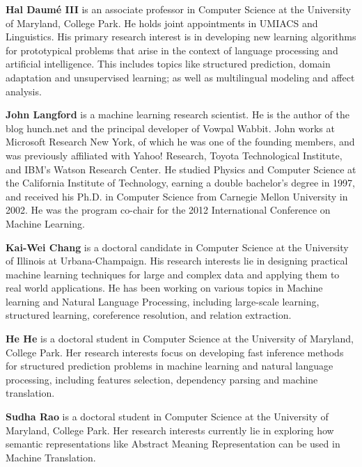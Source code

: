 \begin{bio}
  {\bfseries Hal Daumé III} is an associate professor in Computer Science at the University of Maryland, College Park. He holds joint appointments in UMIACS and Linguistics. His primary research interest is in developing new learning algorithms for prototypical problems that arise in the context of language processing and artificial intelligence. This includes topics like structured prediction, domain adaptation and unsupervised learning; as well as multilingual modeling and affect analysis.

  {\bfseries John Langford} is a machine learning research scientist. He is the author of the blog hunch.net and the principal developer of Vowpal Wabbit. John works at Microsoft Research New York, of which he was one of the founding members, and was previously affiliated with Yahoo! Research, Toyota Technological Institute, and IBM’s Watson Research Center. He studied Physics and Computer Science at the California Institute of Technology, earning a double bachelor’s degree in 1997, and received his Ph.D. in Computer Science from Carnegie Mellon University in 2002. He was the program co-chair for the 2012 International Conference on Machine Learning.

  {\bfseries Kai-Wei Chang} is a doctoral candidate in Computer Science at the University of Illinois at Urbana-Champaign. His research interests lie in designing practical machine learning techniques for large and complex data and applying them to real world applications. He has been working on various topics in Machine learning and Natural Language Processing, including large-scale learning, structured learning, coreference resolution, and relation extraction.

  {\bfseries He He} is a doctoral student in Computer Science at the University of
  Maryland, College Park. Her research interests focus on developing
  fast inference methods for structured prediction problems in machine
  learning and natural language processing, including features
  selection, dependency parsing and machine translation.

  {\bfseries Sudha Rao} is a doctoral student in Computer Science at the University of Maryland, College Park. Her research interests currently lie in exploring how semantic representations like Abstract Meaning Representation can be used in Machine Translation.
  
\end{bio}

